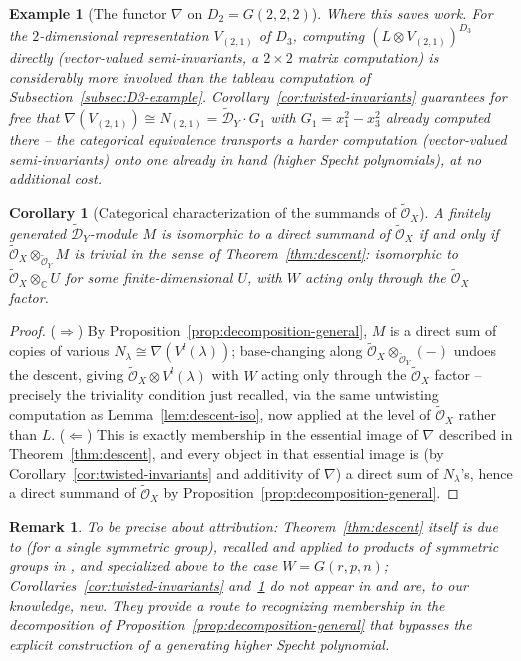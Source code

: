 \documentclass[11pt,a4paper]{article}
\newtheorem{corollary}[theorem]{Corollary}
\newtheorem{remark}[theorem]{Remark}
\newtheorem{example}[theorem]{Example}
\begin{document}
\begin{example}[The functor $\nabla$ on $D_2 = G(2,2,2)$]
\emph{Where this saves work.} For the $2$-dimensional representation
$V_{(2,1)}$ of $D_3$, computing $(L\otimes V_{(2,1)})^{D_3}$ directly
(vector-valued semi-invariants, a $2\times 2$ matrix computation) is
considerably more involved than the tableau computation of
Subsection~\ref{subsec:D3-example}. Corollary~\ref{cor:twisted-invariants}
guarantees for free that
$\nabla(V_{(2,1)}) \cong N_{(2,1)} = \widetilde{\mathcal{D}}_Y \cdot G_1$
with $G_1 = x_1^2-x_3^2$ already computed there -- the categorical
equivalence transports a harder computation (vector-valued
semi-invariants) onto one already in hand (higher Specht polynomials),
at no additional cost.
\end{example}

\begin{corollary}[Categorical characterization of the summands of $\widetilde{\mathcal{O}}_X$]\label{cor:characterization}
A finitely generated $\widetilde{\mathcal{D}}_Y$-module $M$ is
isomorphic to a direct summand of $\widetilde{\mathcal{O}}_X$ if and
only if $\widetilde{\mathcal{O}}_X \otimes_{\widetilde{\mathcal{O}}_Y} M$
is trivial in the sense of Theorem~\ref{thm:descent}: isomorphic to
$\widetilde{\mathcal{O}}_X \otimes_{\mathbb{C}} U$ for some
finite-dimensional $U$, with $W$ acting only through the
$\widetilde{\mathcal{O}}_X$ factor.
\end{corollary}

\begin{proof}
($\Rightarrow$) By Proposition~\ref{prop:decomposition-general}, $M$ is a
direct sum of copies of various $N_\lambda \cong \nabla(V^l(\lambda))$;
base-changing along $\widetilde{\mathcal{O}}_X \otimes_{\widetilde{\mathcal{O}}_Y}(-)$
undoes the descent, giving $\widetilde{\mathcal{O}}_X \otimes V^l(\lambda)$
with $W$ acting only through the $\widetilde{\mathcal{O}}_X$ factor --
precisely the triviality condition just recalled, via the same
untwisting computation as Lemma~\ref{lem:descent-iso}, now applied at
the level of $\widetilde{\mathcal{O}}_X$ rather than $L$.
($\Leftarrow$) This is exactly membership in the essential image of
$\nabla$ described in Theorem~\ref{thm:descent}, and every object in
that essential image is (by Corollary~\ref{cor:twisted-invariants} and
additivity of $\nabla$) a direct sum of $N_\lambda$'s, hence a direct
summand of $\widetilde{\mathcal{O}}_X$ by
Proposition~\ref{prop:decomposition-general}.
\end{proof}

\begin{remark}
To be precise about attribution: Theorem~\ref{thm:descent} itself is
due to \cite[\S 2.4]{Nonkane2019} (for a single symmetric group),
recalled and applied to products of symmetric groups
in \cite[Prop.\ 3.10]{NonkaneTodjihounde2023}, and specialized above
to the case $W=G(r,p,n)$; Corollaries~\ref{cor:twisted-invariants}
and~\ref{cor:characterization} do not appear in
\cite{Nonkane2019,NonkaneTodjihounde2023} and are, to our knowledge,
new. They provide a route to recognizing membership in the
decomposition of Proposition~\ref{prop:decomposition-general} that
bypasses the explicit construction of a generating higher Specht
polynomial.
\end{remark}
\end{document}
